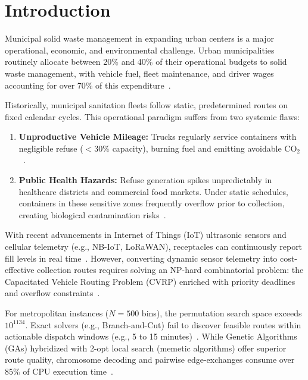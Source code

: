 \documentclass[runningheads]{llncs}
\begin{document}
\section{Introduction}
Municipal solid waste management in expanding urban centers is a major operational, economic, and environmental challenge. Urban municipalities routinely allocate between 20\% and 40\% of their operational budgets to solid waste management, with vehicle fuel, fleet maintenance, and driver wages accounting for over 70\% of this expenditure~\cite{hannan2018capacitated, hannan2020solid}.

Historically, municipal sanitation fleets follow static, predetermined routes on fixed calendar cycles. This operational paradigm suffers from two systemic flaws:
\begin{enumerate}
    \item \textbf{Unproductive Vehicle Mileage:} Trucks regularly service containers with negligible refuse ($<30\%$ capacity), burning fuel and emitting avoidable $\text{CO}_2$~\cite{hannan2018capacitated, erdogan2012green}.
    \item \textbf{Public Health Hazards:} Refuse generation spikes unpredictably in healthcare districts and commercial food markets. Under static schedules, containers in these sensitive zones frequently overflow prior to collection, creating biological contamination risks~\cite{tirkolaee2021sustainable, tirkolaee2023novel}.
\end{enumerate}

With recent advancements in Internet of Things (IoT) ultrasonic sensors and cellular telemetry (e.g., NB-IoT, LoRaWAN), receptacles can continuously report fill levels in real time~\cite{banyai2019optimization, bouleft2023dynamic}. However, converting dynamic sensor telemetry into cost-effective collection routes requires solving an NP-hard combinatorial problem: the Capacitated Vehicle Routing Problem (CVRP) enriched with priority deadlines and overflow constraints~\cite{tirkolaee2023novel, vidal2014hybrid}.

For metropolitan instances ($N=500$ bins), the permutation search space exceeds $10^{1134}$. Exact solvers (e.g., Branch-and-Cut) fail to discover feasible routes within actionable dispatch windows (e.g., 5 to 15 minutes)~\cite{hannan2020solid}. While Genetic Algorithms (GAs) hybridized with 2-opt local search (memetic algorithms) offer superior route quality, chromosome decoding and pairwise edge-exchanges consume over 85\% of CPU execution time~\cite{vidal2014hybrid}.
\end{document}
